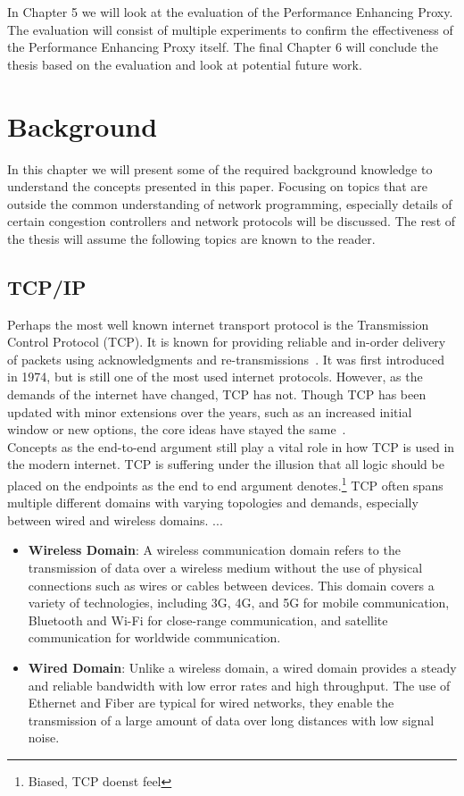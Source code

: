 \documentclass[a4paper,english, 11pt]{report}
\begin{document}
In Chapter 5 we will look at the evaluation of the Performance Enhancing Proxy. The evaluation will consist of multiple experiments to confirm the effectiveness of the Performance Enhancing Proxy itself. The final Chapter 6 will conclude the thesis based on the evaluation and look at potential future work.
\chapter{Background}

In this chapter we will present some of the required background knowledge to understand the concepts presented in this paper. Focusing on topics that are outside the common understanding of network programming, especially details of certain congestion controllers and network protocols will be discussed. The rest of the thesis will assume the following topics are known to the reader.\\

\section{TCP/IP}
Perhaps the most well known internet transport protocol is the Transmission Control Protocol (TCP). It is known for providing reliable and in-order delivery of packets using acknowledgments and re-transmissions~\cite{Eddy_2022}. It was first introduced in 1974, but is still one of the most used internet protocols. However, as the demands of the internet have changed, TCP has not. Though TCP has been updated with minor extensions over the years, such as an increased initial window or new options, the core ideas have stayed the same~\cite{rfc8803}.\\

Concepts as the end-to-end argument still play a vital role in how TCP is used in the modern internet. TCP is suffering under the illusion that all logic should be placed on the endpoints as the end to end argument denotes.\footnote{Biased, TCP doenst feel} TCP often spans multiple different domains with varying topologies and demands, especially between wired and wireless domains. ...
\begin{itemize}
  \item \textbf{Wireless Domain}: A wireless communication domain refers to the transmission of data over a wireless medium without the use of physical connections such as wires or cables between devices. This domain covers a variety of technologies, including 3G, 4G, and 5G for mobile communication, Bluetooth and Wi-Fi for close-range communication, and satellite communication for worldwide communication.
  \item \textbf{Wired Domain}: Unlike a wireless domain, a wired domain provides a steady and reliable bandwidth with low error rates and high throughput. The use of Ethernet and Fiber are typical for wired networks, they enable the transmission of a large amount of data over long distances with low signal noise. 
\end{itemize}
\end{document}

